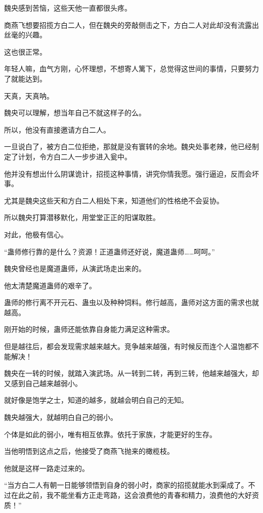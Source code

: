 
\begin{this_body}

魏央感到苦恼，这些天他一直都很头疼。

商燕飞想要招揽方白二人，但在魏央的旁敲侧击之下，方白二人对此却没有流露出丝毫的兴趣。

这也很正常。

年轻人嘛，血气方刚，心怀理想，不想寄人篱下，总觉得这世间的事情，只要努力了就能达到。

天真，天真呐。

魏央可以理解，想当年自己不就这样子的么。

所以，他没有直接邀请方白二人。

一旦说白了，被方白二位拒绝，那就是没有寰转的余地。魏央处事老辣，他已经制定了计划，令方白二人一步步进入瓮中。

他并没有想出什么阴谋诡计，招揽这种事情，讲究你情我愿。强行逼迫，反而会坏事。

尤其是魏央这些天和方白二人相处下来，知道他们的性格绝不会妥协。

所以魏央打算潜移默化，用堂堂正正的阳谋取胜。

对此，他极有信心。

“蛊师修行靠的是什么？资源！正道蛊师还好说，魔道蛊师……呵呵。”

魏央曾经也是魔道蛊师，从演武场走出来的。

他太清楚魔道蛊师的艰辛了。

蛊师的修行离不开元石、蛊虫以及种种饲料。修行越高，蛊师对这方面的需求也就越高。

刚开始的时候，蛊师还能依靠自身能力满足这种需求。

但是越往后，都会发现需求越来越大。竞争越来越强，有时候反而连个人温饱都不能解决！

魏央在一转的时候，就踏入演武场。从一转到二转，再到三转，他越来越强大，却又感到自己越来越弱小。

就好像是饱学之士，知道的越多，就越会明白自己的无知。

魏央越强大，就越明白自己的弱小。

个体是如此的弱小，唯有相互依靠。依托于家族，才能更好的生存。

当他明悟到这点之后，他接受了商燕飞抛来的橄榄枝。

他就是这样一路走过来的。

“当方白二人有朝一日能够领悟到自身的弱小时，商家的招揽就能水到渠成了。不过在此之前，我不能坐看方正走弯路，这会浪费他的青春和精力，浪费他的大好资质！”


\end{this_body}
